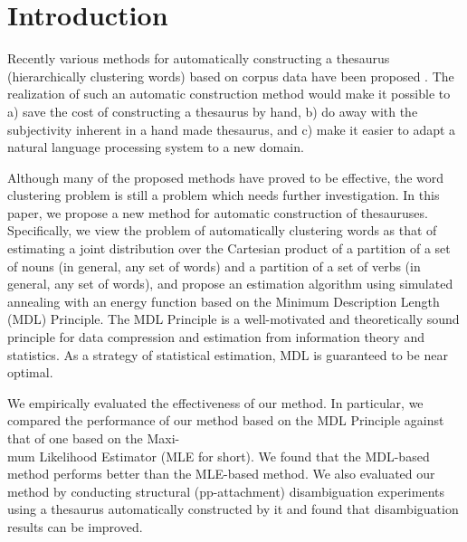                                 

                                


                                
\maketitle

\section{Introduction}
Recently various methods for automatically constructing a thesaurus
(hierarchically clustering words) based on corpus data have been
proposed \cite{Hindle90,Brown92,Pereira93,Tokunaga95}. The realization
of such an automatic construction method would make it possible to a)
save the cost of constructing a thesaurus by hand, b) do away with the
subjectivity inherent in a hand made thesaurus, and c) make it easier
to adapt a natural language processing system to a new domain. 

Although many of the proposed methods have proved to be effective, the
word clustering problem is still a problem which needs further
investigation. In this paper, we propose a new method for automatic
construction of thesauruses. Specifically, we view the problem of
automatically clustering words as that of estimating a joint
distribution over the Cartesian product of a partition of a set of
nouns (in general, any set of words) and a partition of a set of verbs
(in general, any set of words), and propose an estimation algorithm
using simulated annealing with an energy function based on the Minimum
Description Length (MDL) Principle. The MDL Principle is a
well-motivated and theoretically sound principle for data compression
and estimation from information theory and statistics. As a strategy
of statistical estimation, MDL is guaranteed to be near optimal.

We empirically evaluated the effectiveness of our method. In
particular, we compared the performance of our method based on the MDL
 \hspace{-0.4mm}Principle against that \hspace{-0.4mm}of one \hspace{-0.4mm}based on the Maxi- \\ mum Likelihood
Estimator (MLE for short). We found that the MDL-based method performs
better than the MLE-based method. We also evaluated our method by
conducting structural (pp-attachment) disambiguation experiments using a
thesaurus automatically constructed by it and found that
disambiguation results can be improved.

